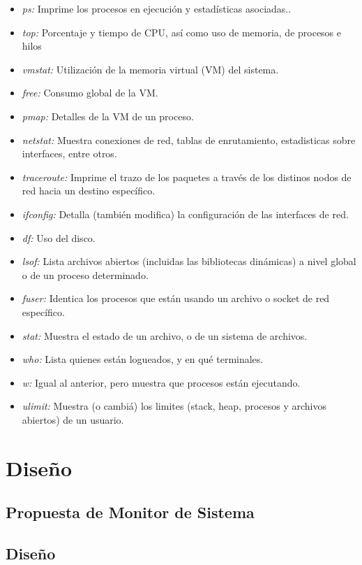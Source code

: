 \documentclass[a4paper,11pt]{article}
\begin{document}
\begin{itemize}
  \item \textit{ps:} Imprime los procesos en ejecución y estadísticas asociadas..
  \item \textit{top:} Porcentaje y tiempo de CPU, así como uso de memoria, de procesos e hilos
  \item \textit{vmstat:} Utilización de la memoria virtual (VM) del sistema.
  \item \textit{free:} Consumo global de la VM.
  \item \textit{pmap:} Detalles de la VM de un proceso.
  \item \textit{netstat:} Muestra conexiones de red, tablas de enrutamiento, estadisticas sobre interfaces, entre otros.
  \item \textit{traceroute:} Imprime el trazo de los paquetes a través de los distinos nodos de red hacia un destino específico.
  \item \textit{ifconfig:} Detalla (también modifica) la configuración de las interfaces de red.
  \item \textit{df:} Uso del disco.
  \item \textit{lsof:} Lista archivos abiertos (incluidas las bibliotecas dinámicas) a nivel global o de un proceso determinado.
  \item \textit{fuser:} Identica los procesos que están usando un archivo o socket de red específico.
  \item \textit{stat:} Muestra el estado de un archivo, o de un sistema de archivos.
  \item \textit{who:} Lista quienes están logueados, y en qué terminales.
  \item \textit{w:} Igual al anterior, pero muestra que procesos están ejecutando.
  \item \textit{ulimit:} Muestra (o cambiá) los limites (stack, heap, procesos y archivos abiertos) de un usuario.
\end{itemize}


\section{Diseño}

\subsection{Propuesta de Monitor de Sistema}

\subsection{Diseño}
\end{document}
